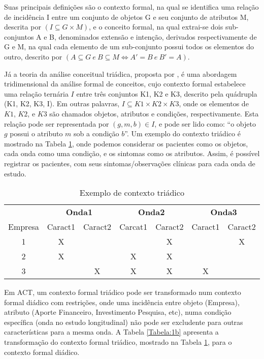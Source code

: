 \documentclass[12pt]{article}
\begin{document}
Suas principais definições são o contexto formal, na qual se identifica uma relação de incidência I entre um conjunto de objetos G e seu conjunto de atributos M, descrita por $(I\subseteq{G \times M})$, e o conceito formal, na qual extrai-se dois sub-conjuntos A e B, denominados extensão e intenção, derivados respectivamente de G e M, na qual cada elemento de um sub-conjunto possui todos os elementos do outro, descrito por $(A \subseteq{G} \ e \ B \subseteq{M} \iff A' = B \ e \ B' = A)$.

Já a teoria da análise conceitual triádica, proposta por \cite{lehmann:95}, é uma abordagem tridimensional da análise formal de conceitos, cujo contexto formal estabelece uma relação ternária $I$ entre três conjuntos K1, K2 e K3, descrito pela quádrupla (K1, K2, K3, I). Em outras palavras, $I \subseteq K1 \times K2 \times K3$, onde os elementos de $K1$, $K2$, e $K3$ são chamados objetos, atributos e condições, respectivamente. Esta relação pode ser representada por $(g,m,b) \in I$, e pode ser lido como: “o objeto $g$ possui o atributo $m$ sob a condição $b$”. Um exemplo do contexto triádico é mostrado na Tabela \ref{Tabela:1}, onde podemos considerar os pacientes como os objetos, cada onda como uma condição, e os sintomas como os atributos. Assim, é possível registrar os pacientes, com seus sintomas/observações clínicas para cada onda de estudo.


\begin{table}[h!] 
\scriptsize
\begin{center}
\caption{Exemplo de contexto triádico} \label{Tabela:1}
\begin{tabular}{c|cc|cc|cc} \hline
&\multicolumn{2}{c|}{\textbf{Onda1}}&\multicolumn{2}{c|}{\textbf{Onda2}}&\multicolumn{2}{c}{\textbf{Onda3}}
\\ Empresa &Caract1&Caract2&Carcat1&Caract2&Caract1&Caract2\\
\hline
1   & X &  
    &   & X
    &   & X \\
2   & X &  
    & X & X
    &   &   \\
3   &   & X 
    & X & X
    & X &   \\
    \hline
\end{tabular}
\end{center}
\end{table}

Em ACT, um contexto formal triádico pode ser transformado num contexto formal diádico com restrições, onde uma incidência entre objeto (Empresa), atributo (Aporte Financeiro, Investimento Pesquisa, etc), numa condição específica (onda no estudo longitudinal) não pode ser excludente para outras características para a mesma onda. A Tabela \ref{Tabela:1b} apresenta a transformação do contexto formal triádico, mostrado na Tabela \ref{Tabela:1}, para o contexto formal diádico.
\end{document}
